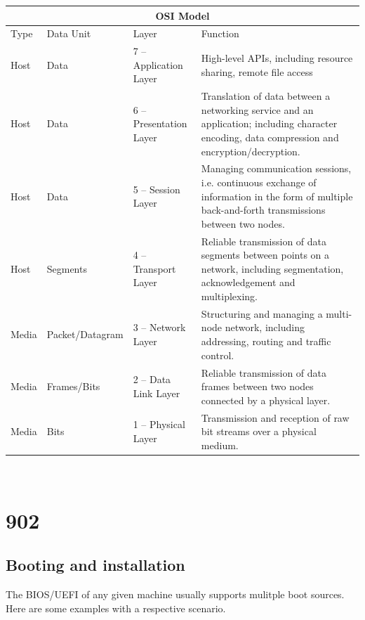 \documentclass{article}
\begin{document}
\begin{tabular}{ |p{1cm}||p{2.8cm}|p{3.8cm}|p{6cm}|  }
 \hline
 \multicolumn{4}{|c|}{\textbf{OSI Model}} \\
 \hline
 Type & Data Unit & Layer & Function\\
 \hline
 Host & Data & 7 -- Application Layer & High-level APIs, including resource sharing, remote file access\\
 \hline
 Host & Data & 6 -- Presentation Layer & Translation of data between a networking service and an application; including character encoding, data compression and encryption/decryption.\\
 \hline
 Host & Data & 5 -- Session Layer & Managing communication sessions, i.e. continuous exchange of information in the form of multiple back-and-forth transmissions between two nodes.\\
 \hline
 Host & Segments & 4 -- Transport Layer & Reliable transmission of data segments between points on a network, including segmentation, acknowledgement and multiplexing.\\
 \hline
 Media & Packet/Datagram & 3 -- Network Layer & Structuring and managing a multi-node network, including addressing, routing and traffic control.\\
 \hline
 Media & Frames/Bits & 2 -- Data Link Layer & Reliable transmission of data frames between two nodes connected by a physical layer.\\
 \hline
 Media & Bits & 1 -- Physical Layer & Transmission and reception of raw bit streams over a physical medium.\\
 \hline
\end{tabular}\\

\chapter{902}

\section{Booting and installation}

The BIOS/UEFI of any given machine usually supports mulitple boot sources. Here are some examples with a respective scenario.
\end{document}
